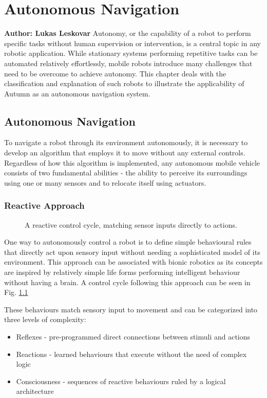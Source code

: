 \chapter{Autonomous Navigation}

\textbf{Author: Lukas Leskovar} 
Autonomy, or the capability of a robot to perform specific tasks without human supervision or intervention, is a central topic in any robotic application.
While stationary systems performing repetitive tasks can be automated relatively effortlessly, mobile robots introduce many challenges that need to be overcome to achieve autonomy.
This chapter deals with the classification and explanation of such robots to illustrate the applicability of Autumn as an autonomous navigation system.

\section{Autonomous Navigation}
To navigate a robot through its environment autonomously, it is necessary to develop an algorithm that employs it to move without any external controls. Regardless of how this algorithm is implemented, any autonomous mobile vehicle consists of two fundamental abilities - the ability to perceive its surroundings using one or many sensors and to relocate itself using actuators. 

\subsection{Reactive Approach}

\begin{figure}
	\centering
	
	\caption{
		A reactive control cycle, matching sensor inputs directly to actions.
	}
	\label{fig:reactiveApproach}
\end{figure}

One way to autonomously control a robot is to define simple behavioural rules that directly act upon sensory input without needing a sophisticated model of its environment. 
This approach can be associated with bionic robotics as its concepts are inspired by relatively simple life forms performing intelligent behaviour without having a brain. 
A control cycle following this approach can be seen in Fig. \ref{fig:reactiveApproach}

These behaviours match sensory input to movement and can be categorized into three levels of complexity:
\begin{itemize}
	\item Reflexes - pre-programmed direct connections between stimuli and actions
	\item Reactions - learned behaviours that execute without the need of complex logic 
	\item Consciousness - sequences of reactive behaviours ruled by a logical architecture
\end{itemize}

